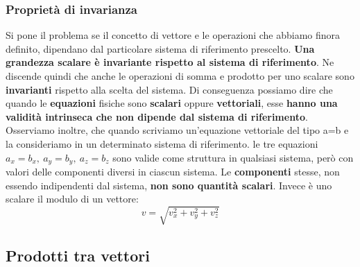 \documentclass{article}
\numberwithin{equation}{subsection}
\begin{document}
\subsubsection{Proprietà di invarianza}
Si pone il problema se il concetto di vettore e le operazioni che abbiamo finora definito, dipendano dal particolare sistema di riferimento prescelto. \textbf{Una grandezza scalare è invariante rispetto al sistema di riferimento}. Ne discende quindi che anche le operazioni di somma e prodotto per uno scalare sono \textbf{invarianti} rispetto alla scelta del sistema. Di conseguenza possiamo dire che quando le \textbf{equazioni} fisiche sono \textbf{scalari} oppure \textbf{vettoriali}, esse \textbf{hanno una validità intrinseca che non dipende dal sistema di riferimento}. Osserviamo inoltre, che quando scriviamo un'equazione vettoriale del tipo a=b e la consideriamo in un determinato sistema di riferimento. le tre equazioni $a_x=b_x, \ a_y=b_y, \ a_z=b_z$ sono valide come struttura in qualsiasi sistema, però con valori delle componenti diversi in ciascun sistema. Le \textbf{componenti} stesse, non essendo indipendenti dal sistema, \textbf{non sono quantità scalari}. Invece è uno scalare il modulo di un vettore:
\begin{equation}
    v=\sqrt{v_x^2+v_y^2+v_z^2}
\end{equation}
\newpage
\subsection{Prodotti tra vettori}
\end{document}
